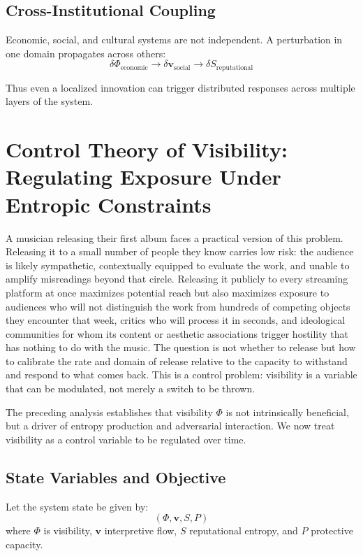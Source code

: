 \documentclass[12pt,a4paper]{article}
\begin{document}
\subsection{Cross-Institutional Coupling}

Economic, social, and cultural systems are not independent. A perturbation in one domain propagates across others:
\[
\delta \Phi_{\text{economic}} \rightarrow \delta \mathbf{v}_{\text{social}} \rightarrow \delta S_{\text{reputational}}
\]

Thus even a localized innovation can trigger distributed responses across multiple layers of the system.

\section{Control Theory of Visibility: Regulating Exposure Under Entropic Constraints}

A musician releasing their first album faces a practical version of this problem. Releasing it to a small number of people they know carries low risk: the audience is likely sympathetic, contextually equipped to evaluate the work, and unable to amplify misreadings beyond that circle. Releasing it publicly to every streaming platform at once maximizes potential reach but also maximizes exposure to audiences who will not distinguish the work from hundreds of competing objects they encounter that week, critics who will process it in seconds, and ideological communities for whom its content or aesthetic associations trigger hostility that has nothing to do with the music. The question is not whether to release but how to calibrate the rate and domain of release relative to the capacity to withstand and respond to what comes back. This is a control problem: visibility is a variable that can be modulated, not merely a switch to be thrown.

The preceding analysis establishes that visibility $\Phi$ is not intrinsically beneficial, but a driver of entropy production and adversarial interaction. We now treat visibility as a control variable to be regulated over time.

\subsection{State Variables and Objective}

Let the system state be given by:
\[
(\Phi, \mathbf{v}, S, P)
\]
where $\Phi$ is visibility, $\mathbf{v}$ interpretive flow, $S$ reputational entropy, and $P$ protective capacity.
\end{document}
